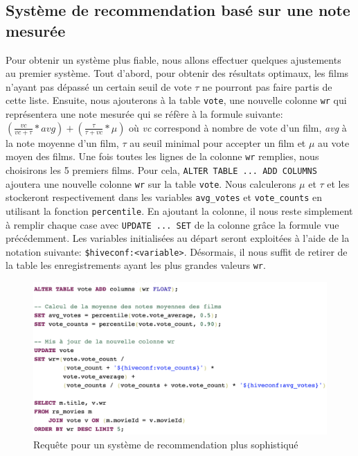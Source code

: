 \documentclass[a4paper, 12pt, oneside]{book}
\begin{document}
\subsection{Système de recommendation basé sur une note mesurée}
Pour obtenir un système plus fiable, nous allons effectuer quelques ajustements au premier système. Tout d'abord, pour obtenir des résultats optimaux, les films n'ayant pas dépassé un certain seuil de vote $ \tau $ ne pourront pas faire partis de cette liste. Ensuite, nous ajouterons à la table \texttt{vote}, une nouvelle colonne \texttt{wr} qui représentera une note mesurée qui se réfère à la formule suivante: $ (\frac{vc}{vc + \tau} * avg) + (\frac{\tau}{\tau + vc} * \mu) $ où \textit{vc} correspond à nombre de vote d'un film, \textit{avg} à la note moyenne d'un film, $ \tau $ au seuil minimal pour accepter un film et $ \mu $ au vote moyen des films. Une fois toutes les lignes de la colonne \texttt{wr} remplies, nous choisirons les 5 premiers films.
Pour cela, \texttt{ALTER TABLE ... ADD COLUMNS} ajoutera une nouvelle colonne \texttt{wr} sur la table \texttt{vote}. Nous calculerons $ \mu $ et $ \tau $ et les stockeront respectivement dans les variables \texttt{avg\_votes} et \texttt{vote\_counts} en utilisant la fonction \texttt{percentile}. En ajoutant la colonne, il nous reste simplement à remplir chaque case avec \texttt{UPDATE ... SET} de la colonne grâce la formule vue précédemment. Les variables initialisées au départ seront exploitées à l'aide de la notation suivante: \texttt{\${hiveconf:<variable>}}. Désormais, il nous suffit de retirer de la table les enregistrements ayant les plus grandes valeurs \texttt{wr}.

\begin{figure}[H]
  \centering
  \includegraphics[width=1.0\textwidth]{images/hive-wr}
  \caption{Requête pour un système de recommendation plus sophistiqué}
  \label{fig:hive-wr}
\end{figure}
\end{document}
